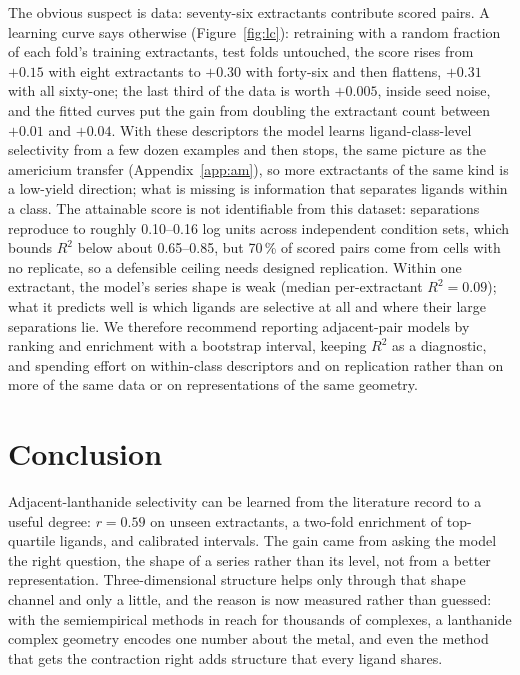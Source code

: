 \documentclass{article}
\begin{document}
The obvious suspect is data: seventy-six extractants contribute scored pairs.
A learning curve says otherwise (Figure~\ref{fig:lc}): retraining with a random fraction of each fold's training extractants, test folds untouched, the score rises from $+0.15$ with eight extractants to $+0.30$ with forty-six and then flattens, $+0.31$ with all sixty-one; the last third of the data is worth $+0.005$, inside seed noise, and the fitted curves put the gain from doubling the extractant count between $+0.01$ and $+0.04$.
With these descriptors the model learns ligand-class-level selectivity from a few dozen examples and then stops, the same picture as the americium transfer (Appendix~\ref{app:am}), so more extractants of the same kind is a low-yield direction; what is missing is information that separates ligands within a class.
The attainable score is not identifiable from this dataset: separations reproduce to roughly 0.10--0.16 log units across independent condition sets, which bounds $R^2$ below about 0.65--0.85, but 70\,\% of scored pairs come from cells with no replicate, so a defensible ceiling needs designed replication.
Within one extractant, the model's series shape is weak (median per-extractant $R^2 = 0.09$); what it predicts well is which ligands are selective at all and where their large separations lie.
We therefore recommend reporting adjacent-pair models by ranking and enrichment with a bootstrap interval, keeping $R^2$ as a diagnostic, and spending effort on within-class descriptors and on replication rather than on more of the same data or on representations of the same geometry.

\section{Conclusion}

Adjacent-lanthanide selectivity can be learned from the literature record to a useful degree: $r = 0.59$ on unseen extractants, a two-fold enrichment of top-quartile ligands, and calibrated intervals.
The gain came from asking the model the right question, the shape of a series rather than its level, not from a better representation.
Three-dimensional structure helps only through that shape channel and only a little, and the reason is now measured rather than guessed: with the semiempirical methods in reach for thousands of complexes, a lanthanide complex geometry encodes one number about the metal, and even the method that gets the contraction right adds structure that every ligand shares.
\end{document}
